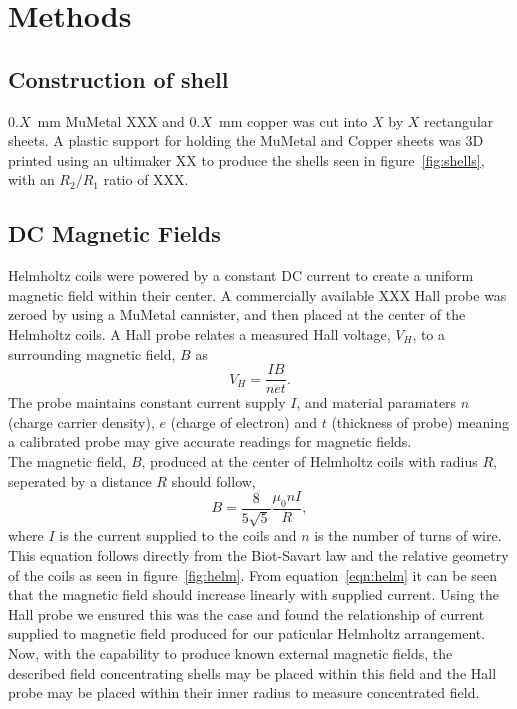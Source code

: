\documentclass[11pt]{iopart}
\begin{document}
\section{Methods}
\subsection{Construction of shell}
$0.X$~mm MuMetal XXX and $0.X$~mm copper was cut into $X$ by $X$ rectangular sheets. 
A plastic support for holding the MuMetal and Copper sheets was 3D printed using an ultimaker XX to produce the shells seen in figure~\ref{fig:shells}, with an $R_2/R_1$ ratio of XXX.\\

\subsection{DC Magnetic Fields}
Helmholtz coils were powered by a constant DC current to create a
uniform magnetic field within their center. A commercially available
XXX Hall probe was zeroed by using a MuMetal cannister, and then
placed at the center of the Helmholtz coils.  A Hall probe relates a
measured Hall voltage, $V_H$, to a surrounding magnetic field, $B$
\cite{XXX} as
\begin{equation}
  V_H = \frac{IB}{net}.
\end{equation}
The probe maintains constant current supply $I$, and material
paramaters $n$ (charge carrier density), $e$ (charge of electron) and
$t$ (thickness of probe) meaning a calibrated probe may give accurate
readings for magnetic fields.\\
The magnetic field, $B$, produced at the center of Helmholtz coils
with radius $R$, seperated by a distance $R$ should follow,
\begin{equation}
  B = \frac{8}{5\sqrt{5}}\frac{\mu_0 nI}{R},
  \label{eqn:helm}
\end{equation}
where $I$ is the current supplied to the coils and $n$ is the number of
turns of wire. This equation follows directly from the Biot-Savart law
\cite{XXX} and the relative geometry of the coils as seen in
figure~\ref{fig:helm}. From equation~\ref{eqn:helm} it can be seen that
the magnetic field should increase linearly with supplied
current. Using the Hall probe we ensured this was the case and found
the relationship of current supplied to magnetic field produced for
our paticular Helmholtz arrangement.\\ Now, with the capability to
produce known external magnetic fields, the described field
concentrating shells may be placed within this field and the Hall
probe may be placed within their inner radius to measure concentrated
field.
\end{document}
